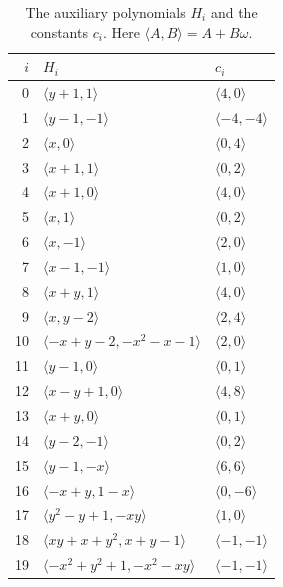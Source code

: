 \documentclass[11pt]{article}
\begin{document}
\begin{table}[htbp]
\centering\small
\caption{The auxiliary polynomials $H_i$ and the constants $c_i$. Here $\langle A,B\rangle=A+B\omega$.}\label{tab:vertices}
\begin{tabular}{@{}rll@{}}
			\toprule
			$i$ & $H_i$ & $c_i$\\\midrule
		0 & $\langle y + 1,1\rangle$ & $\langle 4,0\rangle$\\
		1 & $\langle y - 1,-1\rangle$ & $\langle -4,-4\rangle$\\
		2 & $\langle x,0\rangle$ & $\langle 0,4\rangle$\\
		3 & $\langle x + 1,1\rangle$ & $\langle 0,2\rangle$\\
		4 & $\langle x + 1,0\rangle$ & $\langle 4,0\rangle$\\
		5 & $\langle x,1\rangle$ & $\langle 0,2\rangle$\\
		6 & $\langle x,-1\rangle$ & $\langle 2,0\rangle$\\
		7 & $\langle x - 1,-1\rangle$ & $\langle 1,0\rangle$\\
		8 & $\langle x + y,1\rangle$ & $\langle 4,0\rangle$\\
		9 & $\langle x,y - 2\rangle$ & $\langle 2,4\rangle$\\
		10 & $\langle - x + y - 2,- x^{2} - x - 1\rangle$ & $\langle 2,0\rangle$\\
		11 & $\langle y - 1,0\rangle$ & $\langle 0,1\rangle$\\
		12 & $\langle x - y + 1,0\rangle$ & $\langle 4,8\rangle$\\
		13 & $\langle x + y,0\rangle$ & $\langle 0,1\rangle$\\
		14 & $\langle y - 2,-1\rangle$ & $\langle 0,2\rangle$\\
		15 & $\langle y - 1,- x\rangle$ & $\langle 6,6\rangle$\\
		16 & $\langle - x + y,1 - x\rangle$ & $\langle 0,-6\rangle$\\
		17 & $\langle y^{2} - y + 1,- x y\rangle$ & $\langle 1,0\rangle$\\
		18 & $\langle x y + x + y^{2},x + y - 1\rangle$ & $\langle -1,-1\rangle$\\
		19 & $\langle - x^{2} + y^{2} + 1,- x^{2} - x y\rangle$ & $\langle -1,-1\rangle$\\
			\bottomrule
		\end{tabular}
\end{table}
\end{document}
